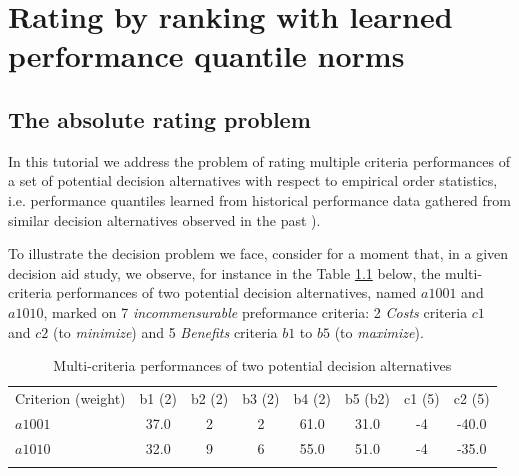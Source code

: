 \chapter{Rating by ranking with learned performance quantile norms}
\label{sec:10}



\section{The absolute rating problem}
\label{sec:10.1}
	  
In this tutorial we address the problem of rating multiple criteria performances of a set of potential decision alternatives with respect to empirical order statistics, i.e. performance quantiles learned from historical performance data gathered from similar decision alternatives observed in the past \citep{CPSTAT-L5}).

To illustrate the decision problem we face, consider for a moment that, in a given decision aid study, we observe, for instance in the Table \ref{tab:10.1} below, the multi-criteria performances of two potential decision alternatives, named $a1001$ and $a1010$, marked on 7 \emph{incommensurable} preformance criteria: 2 \emph{Costs} criteria $c1$ and $c2$ (to \emph{minimize}) and 5 \emph{Benefits} criteria $b1$ to $b5$ (to \emph{maximize}). 

\begin{table}[h]
\caption{Multi-criteria performances of two potential decision alternatives}
\label{tab:10.1}       %
\begin{center}
    \begin{tabular}{l|c|c|c|c|c|c|c}
      \hline\noalign{\smallskip}
      Criterion (weight) & b1 (2) & b2 (2) & b3 (2) & b4 (2) & b5 (b2) & c1 (5) & c2 (5)\\
      \noalign{\smallskip}\hline\noalign{\smallskip}
    $a1001$ &   37.0  &  2 & 2 & 61.0 & 31.0 & -4 & -40.0\\
    $a1010$ &   32.0 & 9 & 6 & 55.0 & 51.0 & -4 & -35.0 \\
      \noalign{\smallskip}\hline
    \end{tabular}
\end{center}
\end{table}

